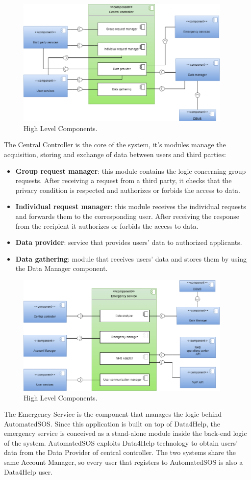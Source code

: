 \begin{figure}[ht]
    \centering
    \includegraphics[width=300pt]{images/CompView/Component_view2.png}
    \caption{High Level Components.}
\end{figure}
\noindent The Central Controller is the core of the system, it's modules manage the acquisition, storing and exchange of data between users and third parties:
\begin{itemize}
    \item \textbf{Group request manager}: this module contains the logic concerning group requests. After receiving a request from a third party, it checks that the privacy condition is respected and authorizes or forbids the access to data.
    \item \textbf{Individual request manager}: this module receives the individual requests and forwards them to the corresponding user. After receiving the response from the recipient it authorizes or forbids the access to data.
    \item \textbf{Data provider}: service that provides users' data to authorized applicants.
    \item \textbf{Data gathering}: module that receives users' data and stores them by using the Data Manager component.
\end{itemize}
\clearpage
\hypertarget{ES}{}
\begin{figure}[ht]
    \centering
    \includegraphics[width=300pt]{images/CompView/Component_view3.png}
    \caption{High Level Components.}
\end{figure}
\noindent The Emergency Service is the component that manages the logic behind AutomatedSOS.
Since this application is built on top of Data4Help, the emergency service is conceived as a stand-alone module inside the back-end logic of the system.
AutomatedSOS exploits Data4Help technology to obtain users' data from the Data Provider of central controller.
The two systems share the same Account Manager, so every user that registers to AutomatedSOS is also a Data4Help user. 

